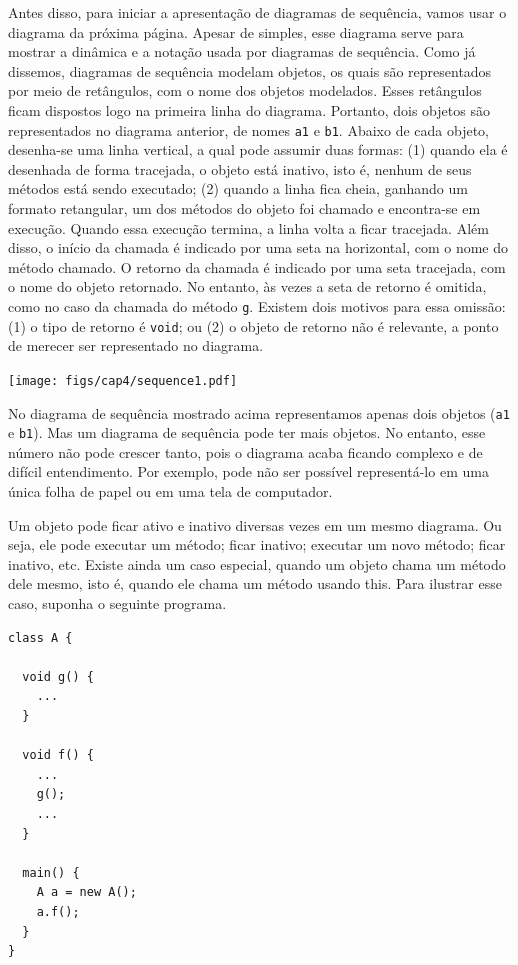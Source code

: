 \documentclass[
  11pt,
  twoside]{book}
\newcommand{\passthrough}[1]{#1}
\begin{document}
Antes disso, para iniciar a apresentação de diagramas de sequência,
vamos usar o diagrama da próxima página. Apesar de simples, esse
diagrama serve para mostrar a dinâmica e a notação usada por diagramas
de sequência. Como já dissemos, diagramas de sequência modelam objetos,
os quais são representados por meio de retângulos, com o nome dos
objetos modelados. Esses retângulos ficam dispostos logo na primeira
linha do diagrama. Portanto, dois objetos são representados no diagrama
anterior, de nomes \passthrough{\lstinline!a1!} e
\passthrough{\lstinline!b1!}. Abaixo de cada objeto, desenha-se uma
linha vertical, a qual pode assumir duas formas: (1) quando ela é
desenhada de forma tracejada, o objeto está inativo, isto é, nenhum de
seus métodos está sendo executado; (2) quando a linha fica cheia,
ganhando um formato retangular, um dos métodos do objeto foi chamado e
encontra-se em execução. Quando essa execução termina, a linha volta a
ficar tracejada. Além disso, o início da chamada é indicado por uma seta
na horizontal, com o nome do método chamado. O retorno da chamada é
indicado por uma seta tracejada, com o nome do objeto retornado. No
entanto, às vezes a seta de retorno é omitida, como no caso da chamada
do método \passthrough{\lstinline!g!}. Existem dois motivos para essa
omissão: (1) o tipo de retorno é \passthrough{\lstinline!void!}; ou (2)
o objeto de retorno não é relevante, a ponto de merecer ser representado
no diagrama.

\texttt{[image: figs/cap4/sequence1.pdf]}

No diagrama de sequência mostrado acima representamos apenas dois
objetos (\passthrough{\lstinline!a1!} e \passthrough{\lstinline!b1!}).
Mas um diagrama de sequência pode ter mais objetos. No entanto, esse
número não pode crescer tanto, pois o diagrama acaba ficando complexo e
de difícil entendimento. Por exemplo, pode não ser possível
representá-lo em uma única folha de papel ou em uma tela de computador.

Um objeto pode ficar ativo e inativo diversas vezes em um mesmo
diagrama. Ou seja, ele pode executar um método; ficar inativo; executar
um novo método; ficar inativo, etc. Existe ainda um caso especial,
quando um objeto chama um método dele mesmo, isto é, quando ele chama um
método usando this. Para ilustrar esse caso, suponha o seguinte
programa.

\begin{lstlisting}
class A {

  void g() { 
    ... 
  } 

  void f() {
    ... 
    g(); 
    ...
  }

  main() {
    A a = new A();
    a.f();
  }
}
\end{lstlisting}
\end{document}
